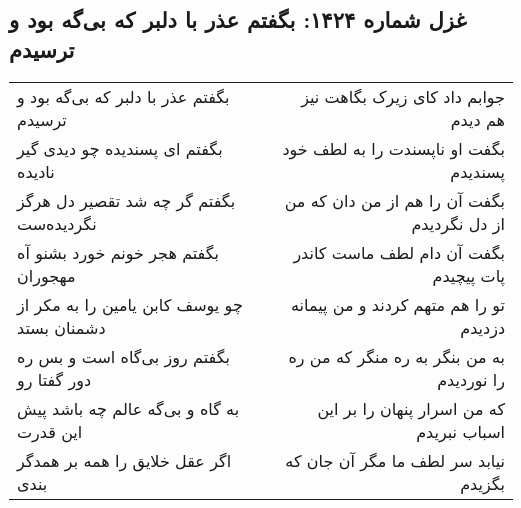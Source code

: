 \begin{center}
\section*{غزل شماره ۱۴۲۴: بگفتم عذر با دلبر که بی‌گه بود و ترسیدم}
\label{sec:1424}
\begin{longtable}{l p{0.5cm} r}
بگفتم عذر با دلبر که بی‌گه بود و ترسیدم
&&
جوابم داد کای زیرک بگاهت نیز هم دیدم
\\
بگفتم ای پسندیده چو دیدی گیر نادیده
&&
بگفت او ناپسندت را به لطف خود پسندیدم
\\
بگفتم گر چه شد تقصیر دل هرگز نگردیده‌ست
&&
بگفت آن را هم از من دان که من از دل نگردیدم
\\
بگفتم هجر خونم خورد بشنو آه مهجوران
&&
بگفت آن دام لطف ماست کاندر پات پیچیدم
\\
چو یوسف کابن یامین را به مکر از دشمنان بستد
&&
تو را هم متهم کردند و من پیمانه دزدیدم
\\
بگفتم روز بی‌گاه است و بس ره دور گفتا رو
&&
به من بنگر به ره منگر که من ره را نوردیدم
\\
به گاه و بی‌گه عالم چه باشد پیش این قدرت
&&
که من اسرار پنهان را بر این اسباب نبریدم
\\
اگر عقل خلایق را همه بر همدگر بندی
&&
نیابد سر لطف ما مگر آن جان که بگزیدم
\\
\end{longtable}
\end{center}

